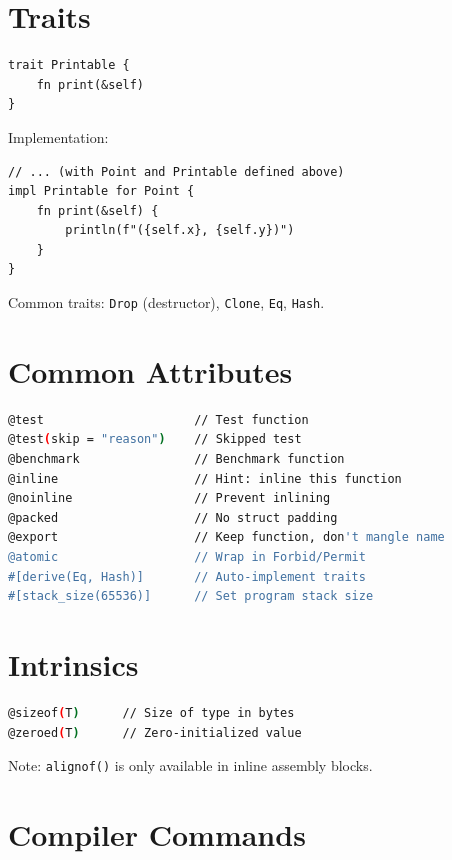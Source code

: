 \section{Traits}

\begin{lstlisting}
trait Printable {
    fn print(&self)
}
\end{lstlisting}

Implementation:

\begin{lstlisting}
// ... (with Point and Printable defined above)
impl Printable for Point {
    fn print(&self) {
        println(f"({self.x}, {self.y})")
    }
}
\end{lstlisting}

Common traits: \texttt{Drop} (destructor), \texttt{Clone}, \texttt{Eq}, \texttt{Hash}.

\section{Common Attributes}

\begin{lstlisting}[language=bash]
@test                     // Test function
@test(skip = "reason")    // Skipped test
@benchmark                // Benchmark function
@inline                   // Hint: inline this function
@noinline                 // Prevent inlining
@packed                   // No struct padding
@export                   // Keep function, don't mangle name
@atomic                   // Wrap in Forbid/Permit
#[derive(Eq, Hash)]       // Auto-implement traits
#[stack_size(65536)]      // Set program stack size
\end{lstlisting}

\section{Intrinsics}

\begin{lstlisting}[language=bash]
@sizeof(T)      // Size of type in bytes
@zeroed(T)      // Zero-initialized value
\end{lstlisting}

Note: \texttt{alignof()} is only available in inline assembly blocks.

\section{Compiler Commands}

